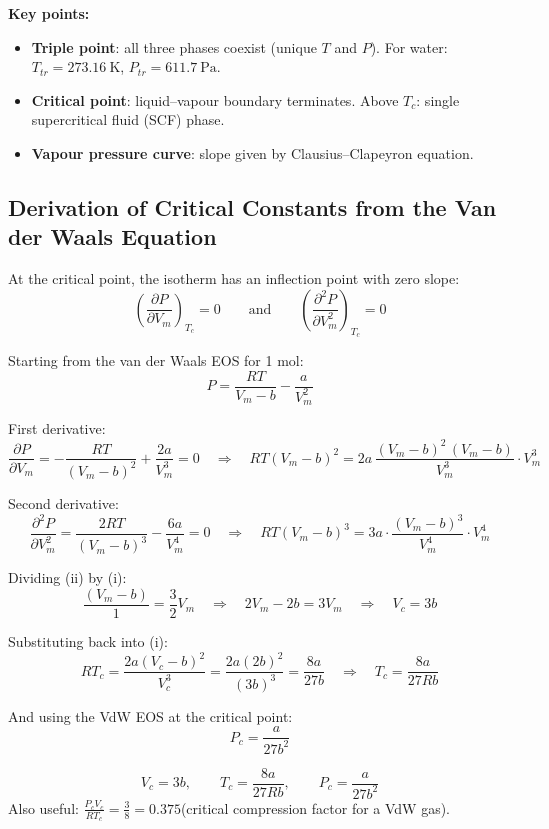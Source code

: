 \documentclass[12pt,a4paper]{article}
\begin{document}
\textbf{Key points:}
\begin{itemize}[leftmargin=*, itemsep=1pt, topsep=2pt]
  \item \textbf{Triple point}: all three phases coexist (unique $T$ and $P$). For water: $T_{tr}=273.16\ \mathrm{K}$, $P_{tr}=611.7\ \mathrm{Pa}$.
  \item \textbf{Critical point}: liquid--vapour boundary terminates. Above $T_c$: single supercritical fluid (SCF) phase.
  \item \textbf{Vapour pressure curve}: slope given by Clausius--Clapeyron equation.
\end{itemize}

\subsection{Derivation of Critical Constants from the Van der Waals Equation}

\begin{tcolorbox}[formulabox, title={Conditions at the Critical Point}]
At the critical point, the isotherm has an inflection point with zero slope:
\[
\left(\frac{\partial P}{\partial V_m}\right)_{T_c} = 0
\qquad\text{and}\qquad
\left(\frac{\partial^2 P}{\partial V_m^2}\right)_{T_c} = 0
\]
\end{tcolorbox}

Starting from the van der Waals EOS for 1 mol:
\[
P = \frac{RT}{V_m - b} - \frac{a}{V_m^2}
\]

First derivative:
\[
\frac{\partial P}{\partial V_m} = -\frac{RT}{(V_m-b)^2} + \frac{2a}{V_m^3} = 0
\quad\Rightarrow\quad RT(V_m-b)^2 = 2a\,\frac{(V_m-b)^2\,(V_m-b)}{V_m^3}\cdot V_m^3 \tag{i}
\]

Second derivative:
\[
\frac{\partial^2 P}{\partial V_m^2} = \frac{2RT}{(V_m-b)^3} - \frac{6a}{V_m^4} = 0
\quad\Rightarrow\quad RT(V_m-b)^3 = 3a\cdot\frac{(V_m-b)^3}{V_m^4}\cdot V_m^4 \tag{ii}
\]

Dividing (ii) by (i):
\[
\frac{(V_m-b)}{1} = \frac{3}{2}V_m \quad\Rightarrow\quad 2V_m - 2b = 3V_m \quad\Rightarrow\quad \boxed{V_c = 3b}
\]

Substituting back into (i):
\[
RT_c = \frac{2a(V_c-b)^2}{V_c^3} = \frac{2a(2b)^2}{(3b)^3} = \frac{8a}{27b}
\quad\Rightarrow\quad \boxed{T_c = \frac{8a}{27Rb}}
\]

And using the VdW EOS at the critical point:
\[
\boxed{P_c = \frac{a}{27b^2}}
\]

\begin{tcolorbox}[formulabox, title={Critical Constants (Van der Waals)}]
\[
V_c = 3b, \qquad T_c = \frac{8a}{27Rb}, \qquad P_c = \frac{a}{27b^2}
\]
Also useful: $\displaystyle\frac{P_c V_c}{RT_c} = \frac{3}{8} = 0.375$\quad (critical compression factor for a VdW gas).
\end{tcolorbox}
\end{document}

